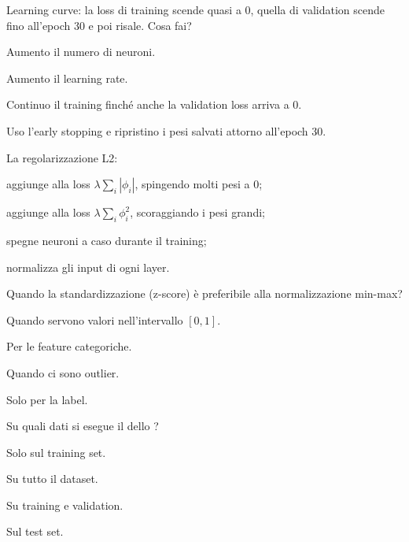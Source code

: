 \begin{domanda}\label{quiz:m15}
Learning curve: la loss di training scende quasi a 0, quella di validation scende fino all'epoch 30 e poi risale. Cosa fai?
\begin{opzioni}
  \item Aumento il numero di neuroni.
  \item Aumento il learning rate.
  \item Continuo il training finché anche la validation loss arriva a 0.
  \item Uso l'early stopping e ripristino i pesi salvati attorno all'epoch 30.
\end{opzioni}
\end{domanda}

\begin{domanda}[regolarizzazione]\label{quiz:m16}
La regolarizzazione L2:
\begin{opzioni}
  \item aggiunge alla loss $\lambda\sum_i|\phi_i|$, spingendo molti pesi a 0;
  \item aggiunge alla loss $\lambda\sum_i\phi_i^2$, scoraggiando i pesi grandi;
  \item spegne neuroni a caso durante il training;
  \item normalizza gli input di ogni layer.
\end{opzioni}
\end{domanda}

\begin{domanda}[scaling]\label{quiz:m17}
Quando la standardizzazione (z-score) è preferibile alla normalizzazione min-max?
\begin{opzioni}
  \item Quando servono valori nell'intervallo $[0,1]$.
  \item Per le feature categoriche.
  \item Quando ci sono outlier.
  \item Solo per la label.
\end{opzioni}
\end{domanda}

\begin{domanda}\label{quiz:m18}
Su quali dati si esegue il  dello ?
\begin{opzioni}
  \item Solo sul training set.
  \item Su tutto il dataset.
  \item Su training e validation.
  \item Sul test set.
\end{opzioni}
\end{domanda}

